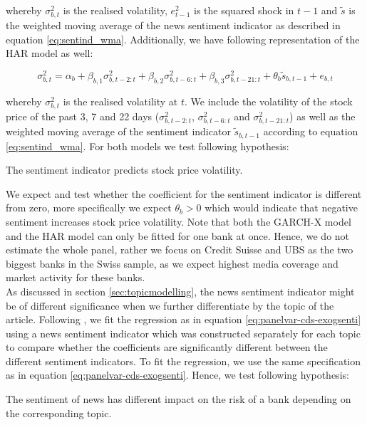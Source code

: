 whereby $\sigma^2_{b,t}$ is the realised volatility, $e^2_{t-1}$ is the squared shock in $t-1$ and $\tilde{s}$ is the weighted moving average of the news sentiment indicator as described in equation \ref{eq:sentind_wma}. Additionally, we have following representation of the HAR model as well:

\begin{equation}
	\sigma^2_{b,t} = \alpha_b + \beta_{b,1}\sigma^2_{b,t-2:t} + \beta_{b,2}\sigma^2_{b,t-6:t} + \beta_{b,3}\sigma^2_{b,t-21:t} + \theta_b \tilde{s}_{b,t-1} + e_{b,t}
\end{equation}

whereby $\sigma^2_{b,t}$ is the realised volatility at $t$. We include the volatility of the stock price of the past 3, 7 and 22 days ($\sigma^2_{b,t-2:t}$, $\sigma^2_{b,t-6:t}$ and $\sigma^2_{b,t-21:t}$) as well as the weighted moving average of the sentiment indicator $\tilde{s}_{b,t-1}$ according to equation \ref{eq:sentind_wma}. For both models we test following hypothesis:

\begin{hyp}
	The sentiment indicator predicts stock price volatility.
\end{hyp} 

We expect and test whether the coefficient for the sentiment indicator is different from zero, more specifically we expect $\theta_b>0$ which would indicate that negative sentiment increases stock price volatility. Note that both the GARCH-X model and the HAR model can only be fitted for one bank at once. Hence, we do not estimate the whole panel, rather we focus on Credit Suisse and UBS as the two biggest banks in the Swiss sample, as we expect highest media coverage and market activity for these banks. \\

As discussed in section \ref{sec:topicmodelling}, the news sentiment indicator might be of different significance when we further differentiate by the topic of the article. Following \cite{roeder2020}, we fit the regression as in equation \ref{eq:panelvar-cds-exogsenti} using a news sentiment indicator which was constructed separately for each topic to compare whether the coefficients are significantly different between the different sentiment indicators. To fit the regression, we use the same specification as in equation \ref{eq:panelvar-cds-exogsenti}. Hence, we test following hypothesis:

\begin{hyp}
	The sentiment of news has different impact on the risk of a bank depending on the corresponding topic.
\end{hyp}


